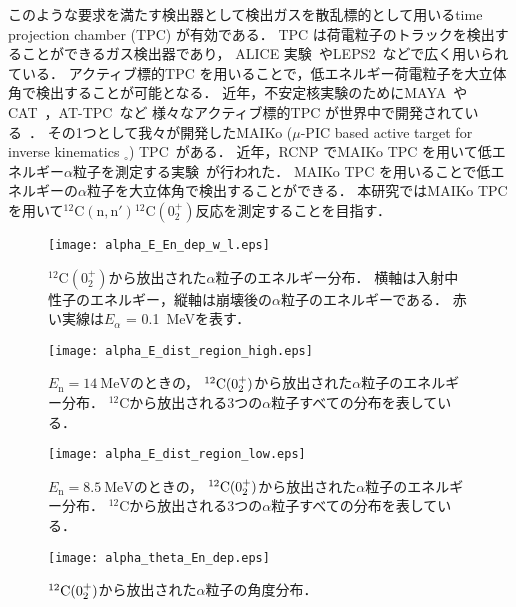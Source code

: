 \documentclass[../master]{subfiles}
\begin{document}
このような要求を満たす検出器として検出ガスを散乱標的として用いるtime projection chamber (TPC) が有効である．
TPC は荷電粒子のトラックを検出することができるガス検出器であり，
ALICE 実験~\cite{alice-tpc}やLEPS2~\cite{kobayakawa_thesis}などで広く用いられている．
アクティブ標的TPC を用いることで，低エネルギー荷電粒子を大立体角で検出することが可能となる．
近年，不安定核実験のためにMAYA~\cite{maya}やCAT~\cite{cat-tpc}，AT-TPC~\cite{at-tpc}など
様々なアクティブ標的TPC が世界中で開発されている~\cite{active-tpc}．
その1つとして我々が開発したMAIKo ($\mu$-PIC based active target for inverse kinematics $_{\circ}$)
 TPC~\cite{maiko, mupic}がある．
近年，RCNP でMAIKo TPC を用いて低エネルギー$\alpha$粒子を測定する実験~\cite{Furuno2019}が行われた．
MAIKo TPC を用いることで低エネルギーの$\alpha$粒子を大立体角で検出することができる．
本研究ではMAIKo TPC を用いて${}^{12}\mathrm{C}(\mathrm{n},\mathrm{n}'){}^{12}\mathrm{C} (0_2^+)$反応を測定することを目指す．
\begin{figure}
  \centering
  \texttt{[image: alpha\_E\_En\_dep\_w\_l.eps]}
  \caption{${}^{12}\mathrm{C} (0_2^+)$から放出された$\alpha$粒子のエネルギー分布．
    横軸は入射中性子のエネルギー，縦軸は崩壊後の$\alpha$粒子のエネルギーである．
    赤い実線は$E_{\alpha}$ = \SI{0.1}{\mega\electronvolt}を表す．}
  \label{fig::alpha_E_En_dep_w_l}
\end{figure}
\begin{figure}
  \centering
  \texttt{[image: alpha\_E\_dist\_region\_high.eps]}
  \caption[${}^{12}{\rm C} (0_2^+)$から放出された$\alpha$粒子のエネルギー分布．]
          {$E_{\mathrm{n}}=\SI{14}{\mega\electronvolt}$のときの，
            ${}^{12}{\rm C} (0_2^+)$から放出された$\alpha$粒子のエネルギー分布．
            ${}^{12}\mathrm{C}$から放出される3つの$\alpha$粒子すべての分布を表している．}
          \label{fig::alpha_E_dist_high}
\end{figure}
\begin{figure}
  \centering
  \texttt{[image: alpha\_E\_dist\_region\_low.eps]}
  \caption[${}^{12}{\rm C} (0_2^+)$から放出された$\alpha$粒子のエネルギー分布．]
          {$E_{\mathrm{n}}=\SI{8.5}{\mega\electronvolt}$のときの，
            ${}^{12}{\rm C} (0_2^+)$から放出された$\alpha$粒子のエネルギー分布．
            ${}^{12}\mathrm{C}$から放出される3つの$\alpha$粒子すべての分布を表している．}
          \label{fig::alpha_E_dist_low}
\end{figure}
\begin{figure}
  \centering
  \texttt{[image: alpha\_theta\_En\_dep.eps]}
  \caption{${}^{12}{\rm C} (0_2^+)$から放出された$\alpha$粒子の角度分布．}
  \label{fig::alpha_theta_En_dep}
\end{figure}
\end{document}
